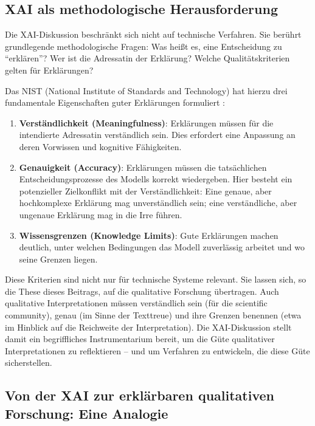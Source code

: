\documentclass[
  12pt,
  a4paper,
  oneside,
  titlepage
]{article}
\begin{document}
\subsection{XAI als methodologische Herausforderung}

Die XAI-Diskussion beschränkt sich nicht auf technische Verfahren. Sie berührt 
grundlegende methodologische Fragen: Was heißt es, eine Entscheidung zu 
\enquote{erklären}? Wer ist die Adressatin der Erklärung? Welche Qualitätskriterien 
gelten für Erklärungen?

Das NIST (National Institute of Standards and Technology) hat hierzu drei fundamentale 
Eigenschaften guter Erklärungen formuliert \citep[ S.~80810]{Ortigossa2024}:

\begin{enumerate}
    \item \textbf{Verständlichkeit (Meaningfulness)}: Erklärungen müssen für die 
    intendierte Adressatin verständlich sein. Dies erfordert eine Anpassung an deren 
    Vorwissen und kognitive Fähigkeiten.
    
    \item \textbf{Genauigkeit (Accuracy)}: Erklärungen müssen die tatsächlichen 
    Entscheidungsprozesse des Modells korrekt wiedergeben. Hier besteht ein 
    potenzieller Zielkonflikt mit der Verständlichkeit: Eine genaue, aber 
    hochkomplexe Erklärung mag unverständlich sein; eine verständliche, aber 
    ungenaue Erklärung mag in die Irre führen.
    
    \item \textbf{Wissensgrenzen (Knowledge Limits)}: Gute Erklärungen machen 
    deutlich, unter welchen Bedingungen das Modell zuverlässig arbeitet und wo 
    seine Grenzen liegen.
\end{enumerate}

Diese Kriterien sind nicht nur für technische Systeme relevant. Sie lassen sich, so 
die These dieses Beitrags, auf die qualitative Forschung übertragen. Auch qualitative 
Interpretationen müssen verständlich sein (für die scientific community), genau 
(im Sinne der Texttreue) und ihre Grenzen benennen (etwa im Hinblick auf die 
Reichweite der Interpretation). Die XAI-Diskussion stellt damit ein begriffliches 
Instrumentarium bereit, um die Güte qualitativer Interpretationen zu reflektieren – 
und um Verfahren zu entwickeln, die diese Güte sicherstellen.

\subsection{Von der XAI zur erklärbaren qualitativen Forschung: Eine Analogie}
\end{document}
